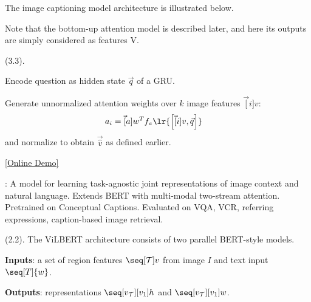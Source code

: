 \documentclass[11pt]{article}
\begin{document}
The image captioning model architecture is illustrated below. 

Note that the bottom-up attention model is described later, and here its outputs are simply considered as features V.

 (3.3). 


\begin{compactenum}
	\item Encode question as hidden state $\vec q$ of a GRU. 
	
	\item Generate unnormalized attention weights over $k$ image features $\vec[i]{v}$:
	\begin{align}
		a_i &= \vec[a]{w}^T f_a\lr{  \left[  \vec[i]{v}, \vec q \right] }
	\end{align}
	and normalize to obtain $\vec{\hat v}$ as defined earlier.
\end{compactenum}








\href{https://vilbert.cloudcv.org}{[Online Demo]}


: A model for learning task-agnostic joint representations of image context and natural language. Extends BERT with multi-modal two-stream attention. Pretrained on Conceptual Captions. Evaluated on VQA, VCR, referring expressions, caption-based image retrieval. 


 (2.2). The ViLBERT architecture consists of two parallel BERT-style models. 
\begin{compactitem}
	\item \textbf{Inputs}: a set of region features $\seq[\mathcal{T}]{v}$ from image $I$ and text input $\seq[T]{w}$.
	\item \textbf{Outputs}: representations $\seq[v_{\mathcal T}][v_1]{h}$ and $\seq[v_{\mathcal T}][v_1]{w}$. 
\end{compactitem}
\end{document}
